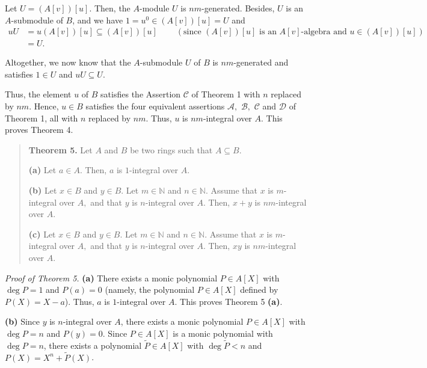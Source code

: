 \documentclass[12pt,final,notitlepage,onecolumn]{article}%
\begin{document}
Let $U=\left(  A\left[  v\right]  \right)  \left[  u\right]  $. Then, the
$A$-module $U$ is $nm$-generated. Besides, $U$ is an $A$-submodule of $B$, and
we have $1=u^{0}\in\left(  A\left[  v\right]  \right)  \left[  u\right]  =U$
and%
\begin{align*}
uU  &  =u\left(  A\left[  v\right]  \right)  \left[  u\right]  \subseteq
\left(  A\left[  v\right]  \right)  \left[  u\right]
\ \ \ \ \ \ \ \ \ \ \left(  \text{since }\left(  A\left[  v\right]  \right)
\left[  u\right]  \text{ is an }A\left[  v\right]  \text{-algebra and }%
u\in\left(  A\left[  v\right]  \right)  \left[  u\right]  \right) \\
&  =U.
\end{align*}


Altogether, we now know that the $A$-submodule $U$ of $B$ is $nm$-generated
and satisfies $1\in U$ and $uU\subseteq U$.

Thus, the element $u$ of $B$ satisfies the Assertion $\mathcal{C}$ of Theorem
1 with $n$ replaced by $nm$. Hence, $u\in B$ satisfies the four equivalent
assertions $\mathcal{A},$ $\mathcal{B},$ $\mathcal{C}$ and $\mathcal{D}$ of
Theorem 1, all with $n$ replaced by $nm$. Thus, $u$ is $nm$-integral over $A$.
This proves Theorem 4.

\begin{quote}
\textbf{Theorem 5.} Let $A$ and $B$ be two rings such that $A\subseteq B$.

\textbf{(a)} Let $a\in A$. Then, $a$ is $1$-integral over $A$.

\textbf{(b)} Let $x\in B$ and $y\in B$. Let $m\in\mathbb{N}$ and
$n\in\mathbb{N}$. Assume that $x$ is $m$-integral over $A,$ and that $y$ is
$n$-integral over $A$. Then, $x+y$ is $nm$-integral over $A$.

\textbf{(c)} Let $x\in B$ and $y\in B$. Let $m\in\mathbb{N}$ and
$n\in\mathbb{N}$. Assume that $x$ is $m$-integral over $A,$ and that $y$ is
$n$-integral over $A$. Then, $xy$ is $nm$-integral over $A$.
\end{quote}

\textit{Proof of Theorem 5.} \textbf{(a)} There exists a monic polynomial
$P\in A\left[  X\right]  $ with $\deg P=1$ and $P\left(  a\right)  =0$
(namely, the polynomial $P\in A\left[  X\right]  $ defined by $P\left(
X\right)  =X-a$). Thus, $a$ is $1$-integral over $A$. This proves Theorem 5
\textbf{(a)}.

\textbf{(b)} Since $y$ is $n$-integral over $A$, there exists a monic
polynomial $P\in A\left[  X\right]  $ with $\deg P=n$ and $P\left(  y\right)
=0$. Since $P\in A\left[  X\right]  $ is a monic polynomial with $\deg P=n$,
there exists a polynomial $\widetilde{P}\in A\left[  X\right]  $ with
$\deg\widetilde{P}<n$ and $P\left(  X\right)  =X^{n}+\widetilde{P}\left(
X\right)  $.
\end{document}
